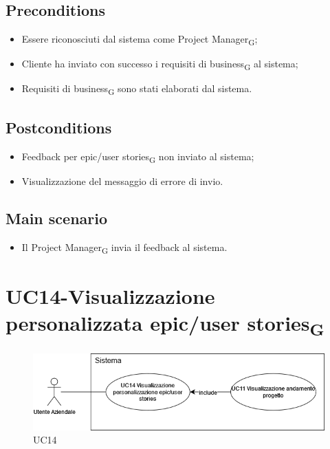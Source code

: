 \documentclass{article}
\begin{document}
   \subsection*{Preconditions}
        \begin{itemize}
            \item Essere riconosciuti dal sistema come Project Manager\textsubscript{G};
            \item Cliente ha inviato con successo i requisiti di business\textsubscript{G} al sistema;
            \item Requisiti di business\textsubscript{G} sono stati elaborati dal sistema.
        \end{itemize}
        
    \subsection*{Postconditions}
        \begin{itemize}
            \item Feedback per epic/user stories\textsubscript{G} non inviato al sistema;
            \item Visualizzazione del messaggio di errore di invio.
        \end{itemize} 
        \subsection*{Main scenario}
        \begin{itemize}
            \item Il Project Manager\textsubscript{G} invia il feedback al sistema.
        \end{itemize}

  
\section{UC14-Visualizzazione personalizzata epic/user stories\textsubscript{G}}
    \begin{figure}[h]
      \centering
      \includegraphics[width=.8\textwidth, height=.6\textheight, keepaspectratio]{documenti/imgUML/UC14-VISUALIZZAZIONE-PERSONALIZZATA-EPIC-USER-STORIES.drawio.png}
        \caption{UC14}
      \label{fig:UC14}
    \end{figure}
    
\end{document}
